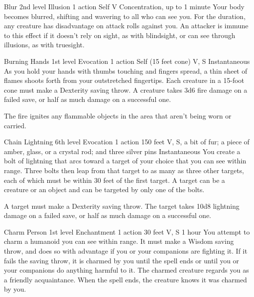 \documentclass[10pt,a4paper,twoside,bg=print,twocolumn,openany,nodeprecatedcode]{dndbook}
\begin{document}


\DndSpellHeader%
{Blur}
{2nd level Illusion}
{1 action}
{Self}
{V}
{Concentration, up to 1 minute}
Your body becomes blurred, shifting and wavering to all who can see you. For the duration, any creature has disadvantage on attack rolls against you. An attacker is immune to this effect if it doesn't rely on sight, as with blindsight, or can see through illusions, as with truesight.



\DndSpellHeader%
{Burning Hands}
{1st level Evocation}
{1 action}
{Self (15 feet cone)}
{V, S}
{Instantaneous}
As you hold your hands with thumbs touching and fingers spread, a thin sheet of flames shoots forth from your outstretched fingertips. Each creature in a 15-foot cone must make a Dexterity saving throw. A creature takes 3d6 fire damage on a failed save, or half as much damage on a successful one.

The fire ignites any flammable objects in the area that aren't being worn or carried.



\DndSpellHeader%
{Chain Lightning}
{6th level Evocation}
{1 action}
{150 feet}
{V, S, a bit of fur; a piece of amber, glass, or a crystal rod; and three silver pins}
{Instantaneous}
You create a bolt of lightning that arcs toward a target of your choice that you can see within range. Three bolts then leap from that target to as many as three other targets, each of which must be within 30 feet of the first target. A target can be a creature or an object and can be targeted by only one of the bolts.

A target must make a Dexterity saving throw. The target takes 10d8 lightning damage on a failed save, or half as much damage on a successful one.



\DndSpellHeader%
{Charm Person}
{1st level Enchantment}
{1 action}
{30 feet}
{V, S}
{1 hour}
You attempt to charm a humanoid you can see within range. It must make a Wisdom saving throw, and does so with advantage if you or your companions are fighting it. If it fails the saving throw, it is charmed by you until the spell ends or until you or your companions do anything harmful to it. The charmed creature regards you as a friendly acquaintance. When the spell ends, the creature knows it was charmed by you.
\end{document}
